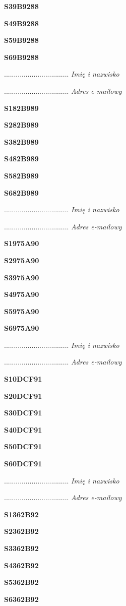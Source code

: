 \Large \textbf{S39B9288}

\Large \textbf{S49B9288}

\Large \textbf{S59B9288}

\Large \textbf{S69B9288}

.................................
\textit{Imię i nazwisko}

.................................
\textit{Adres e-mailowy}

\Large \textbf{S182B989}

\Large \textbf{S282B989}

\Large \textbf{S382B989}

\Large \textbf{S482B989}

\Large \textbf{S582B989}

\Large \textbf{S682B989}

.................................
\textit{Imię i nazwisko}

.................................
\textit{Adres e-mailowy}

\Large \textbf{S1975A90}

\Large \textbf{S2975A90}

\Large \textbf{S3975A90}

\Large \textbf{S4975A90}

\Large \textbf{S5975A90}

\Large \textbf{S6975A90}

.................................
\textit{Imię i nazwisko}

.................................
\textit{Adres e-mailowy}

\Large \textbf{S10DCF91}

\Large \textbf{S20DCF91}

\Large \textbf{S30DCF91}

\Large \textbf{S40DCF91}

\Large \textbf{S50DCF91}

\Large \textbf{S60DCF91}

.................................
\textit{Imię i nazwisko}

.................................
\textit{Adres e-mailowy}

\Large \textbf{S1362B92}

\Large \textbf{S2362B92}

\Large \textbf{S3362B92}

\Large \textbf{S4362B92}

\Large \textbf{S5362B92}

\Large \textbf{S6362B92}

